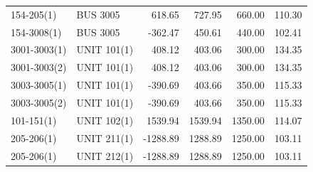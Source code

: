 \documentclass[10pt]{report}
\begin{document}
\begin{table}[H]
{\begin{tabular}{llrrrr}
154-205(1) & BUS 3005 & 618.65 & 727.95 & 660.00 & 110.30 \\
154-3008(1) & BUS 3005 & -362.47 & 450.61 & 440.00 & 102.41 \\
3001-3003(1) & UNIT 101(1) & 408.12 & 403.06 & 300.00 & 134.35 \\
3001-3003(2) & UNIT 101(1) & 408.12 & 403.06 & 300.00 & 134.35 \\
3003-3005(1) & UNIT 101(1) & -390.69 & 403.66 & 350.00 & 115.33 \\
3003-3005(2) & UNIT 101(1) & -390.69 & 403.66 & 350.00 & 115.33 \\
101-151(1) & UNIT 102(1) & 1539.94 & 1539.94 & 1350.00 & 114.07 \\
205-206(1) & UNIT 211(1) & -1288.89 & 1288.89 & 1250.00 & 103.11 \\
205-206(1) & UNIT 212(1) & -1288.89 & 1288.89 & 1250.00 & 103.11 \\
\bottomrule
\end{tabular}}
\end{table}
\end{document}
